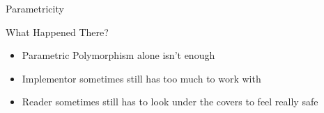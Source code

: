 \begin{section}{Parametricity}
\begin{frame}{What Happened There?}
  \begin{itemize}
    \item Parametric Polymorphism alone isn't enough
    \item Implementor sometimes still has too much to work with
    \item Reader sometimes still has to look under the covers to feel
      really safe
  \end{itemize}
\end{frame}

\end{section}
